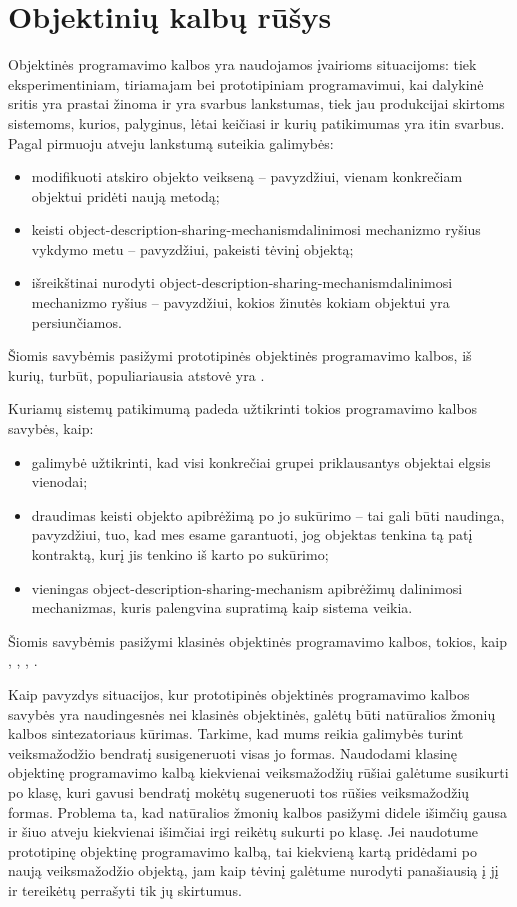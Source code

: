 \section{Objektinių kalbų rūšys}

Objektinės programavimo kalbos yra naudojamos įvairioms situacijoms:
tiek eksperimentiniam, tiriamajam bei prototipiniam programavimui, kai
dalykinė sritis yra prastai žinoma ir yra svarbus lankstumas, tiek
jau produkcijai skirtoms sistemoms, kurios, palyginus,
lėtai keičiasi ir kurių patikimumas yra itin
svarbus\cite{Lieberman:1987:TO:62139.62144}. Pagal
\cite{Lieberman:1987:TO:62139.62144} pirmuoju atveju lankstumą
suteikia galimybės:
\begin{itemize}
  \item modifikuoti atskiro objekto veikseną – pavyzdžiui, vienam
    konkrečiam objektui pridėti naują metodą;
  \item keisti \gls{object-description-sharing-mechanism}{dalinimosi
    mechanizmo} ryšius vykdymo metu – pavyzdžiui, pakeisti tėvinį
    objektą;
  \item išreikštinai nurodyti
    \gls{object-description-sharing-mechanism}{dalinimosi mechanizmo}
    ryšius – pavyzdžiui, kokios žinutės kokiam objektui yra
    persiunčiamos.
\end{itemize}
Šiomis savybėmis pasižymi \gls{}{prototipinės objektinės programavimo
kalbos}, iš kurių, turbūt, populiariausia atstovė yra
.

Kuriamų sistemų patikimumą padeda užtikrinti tokios programavimo
kalbos savybės, kaip:
\begin{itemize}
  \item galimybė užtikrinti, kad visi konkrečiai grupei priklausantys
    objektai elgsis vienodai;
  \item draudimas keisti objekto apibrėžimą po jo sukūrimo – tai
    gali būti naudinga, pavyzdžiui, tuo, kad mes esame garantuoti,
    jog objektas tenkina tą patį kontraktą, kurį jis tenkino iš
    karto po sukūrimo;
  \item vieningas \gls{object-description-sharing-mechanism}{
    apibrėžimų dalinimosi mechanizmas}, kuris palengvina supratimą
    kaip sistema veikia.
\end{itemize}
Šiomis savybėmis pasižymi \gls{}{klasinės objektinės programavimo
kalbos}, tokios, kaip , ,
, .

Kaip pavyzdys situacijos, kur prototipinės objektinės programavimo
kalbos savybės yra naudingesnės nei klasinės objektinės, galėtų
būti natūralios žmonių kalbos sintezatoriaus kūrimas. Tarkime, kad
mums reikia galimybės turint veiksmažodžio bendratį susigeneruoti
visas jo formas. Naudodami klasinę objektinę programavimo kalbą
kiekvienai veiksmažodžių rūšiai galėtume susikurti po klasę,
kuri gavusi bendratį mokėtų sugeneruoti tos rūšies veiksmažodžių
formas. Problema ta, kad natūralios žmonių kalbos pasižymi didele
išimčių gausa ir šiuo atveju kiekvienai išimčiai irgi reikėtų
sukurti po klasę. Jei naudotume prototipinę objektinę programavimo
kalbą, tai kiekvieną kartą pridėdami po naują veiksmažodžio
objektą, jam kaip tėvinį galėtume nurodyti panašiausią į jį ir
tereikėtų perrašyti tik jų skirtumus.

